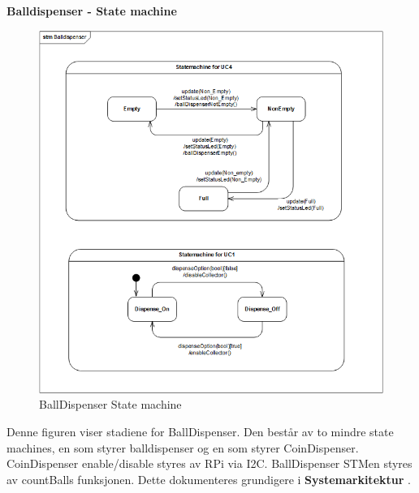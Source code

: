 \documentclass[Rapport/Rapport_main.tex]{subfiles}
\begin{document}
\textbf{Balldispenser - State machine}\\
\begin{figure}[H]
    \centering
    \includegraphics[width=\textwidth]{Arkitektur/Softwarearkitektur/Applikationsmodel/BallDispenser/graphicsBallDispenser/ApplikationsmodelBolddispenserstm.PNG}
    \caption{BallDispenser State machine}
    \label{fig:my_label}
\end{figure}
Denne figuren viser stadiene for BallDispenser. Den består av to mindre state machines, en som styrer balldispenser og en som styrer CoinDispenser. CoinDispenser enable/disable styres av RPi via I2C. BallDispenser STMen styres av countBalls funksjonen. Dette dokumenteres grundigere i \textbf{Systemarkitektur} .
\end{document}
